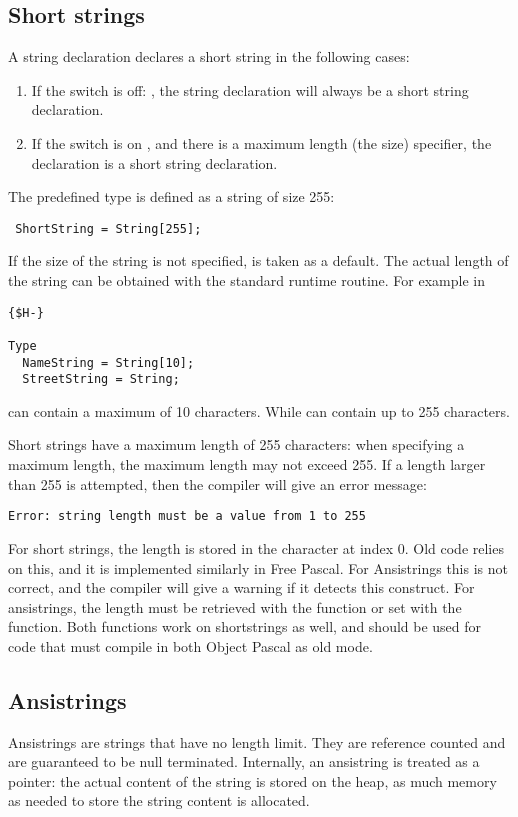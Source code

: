 \subsection{Short strings}
A string declaration declares a short string in the following cases:
\begin{enumerate}
\item If the switch is off: , the string declaration
will always be a short string declaration.
\item If the switch is on , and there is a maximum length (the
size) specifier, the declaration is a short string declaration.
\end{enumerate}
The predefined type  is defined as a string of size 255:
\begin{verbatim}
 ShortString = String[255];
\end{verbatim}
If the size of the string is not specified,  is taken as a
default. The actual length of the string can be obtained with the
 standard runtime routine.
For example in
\begin{verbatim}
{$H-}

Type
  NameString = String[10];
  StreetString = String;
\end{verbatim}
 can contain a maximum of 10 characters. While
 can contain up to 255 characters.

\begin{remark}
Short strings have a maximum length of 255 characters: when specifying a
maximum length, the maximum length may not exceed 255. If a length larger
than 255 is attempted, then the compiler will give an error message:
\begin{verbatim}
Error: string length must be a value from 1 to 255
\end{verbatim}

For short strings, the length is stored in the character at index 0. Old
\tp code relies on this, and it is implemented similarly in Free
Pascal. For Ansistrings this is not correct, and the compiler will give a 
warning if it detects this construct. For ansistrings, the length must be
retrieved with the  function or set with the 
function. Both functions work on shortstrings as well, and should be used
for code that must compile in both Object Pascal as old \tp mode.
\end{remark}

\subsection{Ansistrings}
Ansistrings are strings that have no length limit. They are reference
counted and are guaranteed to be null terminated. Internally, an ansistring is treated as 
a pointer: the actual content of the string is stored on the heap, as much
memory as needed to store the string content is allocated. 

